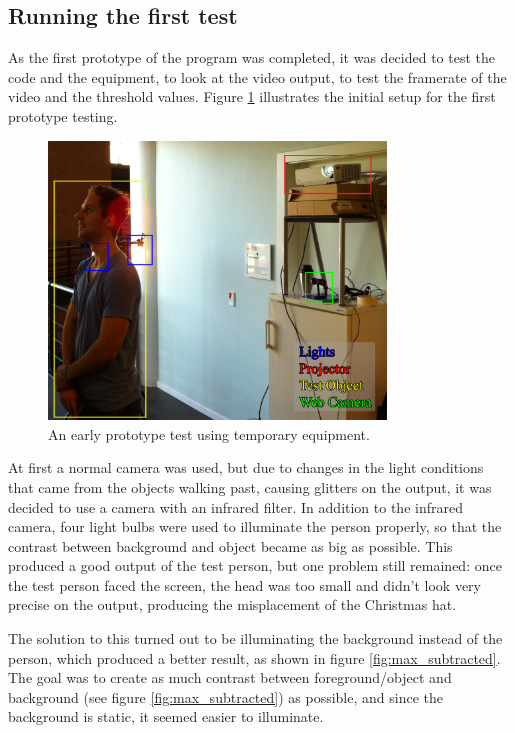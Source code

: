 \subsection{Running the first test}
As the first prototype of the program was completed, it was decided to test the code and the  equipment, to look at the video output, to test the framerate of the video and the threshold values. Figure \ref{fig:ir_cam_test} illustrates the initial setup for the first prototype testing.

\begin{figure}[htbp]
\centering
\includegraphics[width=0.80\textwidth]{Pictures/Test/TestSetup.jpg}
\caption{An early prototype test using temporary equipment.}
\label{fig:ir_cam_test}
\end{figure} 

At first a normal camera was used, but due to changes in the light conditions that came from the objects walking past, causing glitters on the output, it was decided to use a camera with an infrared filter. In addition to the infrared camera, four light bulbs were used to illuminate the person properly, so that the contrast between background and object became as big as possible. This produced a good output of the test person, but one problem still remained: once the test person faced the screen, the head was too small and didn't look very precise on the output, producing the misplacement of the Christmas hat.

The solution to this turned out to be illuminating the background instead of the person, which produced a better result, as shown in figure \ref{fig:max_subtracted}. The goal was to create as much contrast between foreground/object and background (see figure \ref{fig:max_subtracted}) as possible, and since the background is static, it seemed easier to illuminate.

